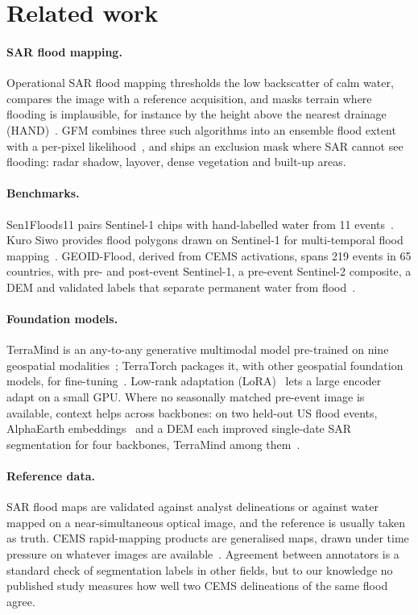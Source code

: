 \documentclass[10pt,twocolumn,a4paper]{article}
\begin{document}
\section{Related work}

\paragraph{SAR flood mapping.} Operational SAR flood mapping thresholds the low backscatter of calm water, compares the
image with a reference acquisition, and masks terrain where flooding is implausible, for instance by the height above
the nearest drainage (HAND)~\citep{nobre2011hand}. GFM combines three such algorithms into an ensemble flood extent
with a per-pixel likelihood~\citep{salamon2021gfm,krullikowski2023gfm}, and ships an exclusion mask where SAR cannot
see flooding: radar shadow, layover, dense vegetation and built-up areas.

\paragraph{Benchmarks.} Sen1Floods11 pairs Sentinel-1 chips with hand-labelled water from 11
events~\citep{bonafilia2020sen1floods11}. Kuro Siwo provides flood polygons drawn on Sentinel-1 for multi-temporal
flood mapping~\citep{bountos2024kurosiwo}. GEOID-Flood, derived from CEMS activations, spans 219 events in 65
countries, with pre- and post-event Sentinel-1, a pre-event Sentinel-2 composite, a DEM and validated labels that
separate permanent water from flood~\citep{chiriaco2026geoid}.

\paragraph{Foundation models.} TerraMind is an any-to-any generative multimodal model pre-trained on nine geospatial
modalities~\citep{jakubik2025terramind}; TerraTorch packages it, with other geospatial foundation models, for
fine-tuning~\citep{gomes2025terratorch}. Low-rank adaptation (LoRA)~\citep{hu2021lora} lets a large encoder adapt on
a small GPU. Where no seasonally matched pre-event image is available, context helps across backbones: on two
held-out US flood events, AlphaEarth embeddings~\citep{brown2025alphaearth} and a DEM each improved single-date SAR
segmentation for four backbones, TerraMind among them~\citep{thasma2026alphaearth}.

\paragraph{Reference data.} SAR flood maps are validated against analyst delineations or against water mapped on a
near-simultaneous optical image, and the reference is usually taken as truth. CEMS rapid-mapping products are
generalised maps, drawn under time pressure on whatever images are available~\citep{cems2026rapidmapping}.
Agreement between annotators is a standard check of segmentation labels
in other fields, but to our knowledge no published study measures how well two CEMS delineations of the same flood
agree.
\end{document}
